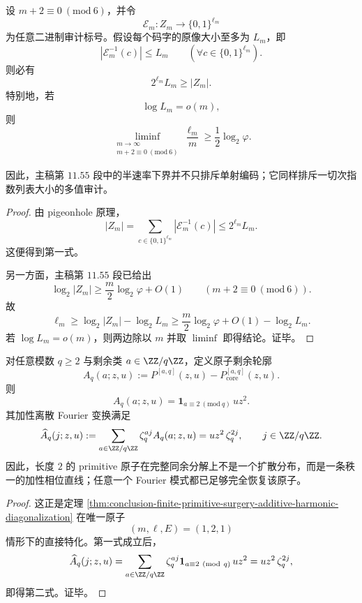 \begin{theorem}[六倍窗零块的次指数列表审计不可能性]\label{thm:conclusion-sixfold-zero-block-subexponential-list-impossibility}
设 \(m+2\equiv 0\ (\mathrm{mod}\ 6)\)，并令
\[
\mathcal E_m: Z_m\to\{0,1\}^{\ell_m}
\]
为任意二进制审计标号。假设每个码字的原像大小至多为 \(L_m\)，即
\[
|\mathcal E_m^{-1}(c)|\le L_m
\qquad
(\forall c\in\{0,1\}^{\ell_m}).
\]
则必有
\[
2^{\ell_m}L_m\ge |Z_m|.
\]
特别地，若
\[
\log L_m=o(m),
\]
则
\[
\liminf_{\substack{m\to\infty\\ m+2\equiv0\ (\mathrm{mod}\ 6)}}\frac{\ell_m}{m}
\ge \frac12\log_2\varphi.
\]

因此，主稿第 \(11.55\) 段中的半速率下界并不只排斥单射编码；它同样排斥一切次指数列表大小的多值审计。
\end{theorem}
\begin{proof}
由 pigeonhole 原理，
\[
|Z_m|
=
\sum_{c\in\{0,1\}^{\ell_m}} |\mathcal E_m^{-1}(c)|
\le 2^{\ell_m}L_m.
\]
这便得到第一式。

另一方面，主稿第 \(11.55\) 段已给出
\[
\log_2|Z_m|\ge \frac{m}{2}\log_2\varphi+O(1)
\qquad
(m+2\equiv0\ (\mathrm{mod}\ 6)).
\]
故
\[
\ell_m
\ge
\log_2|Z_m|-\log_2L_m
\ge
\frac{m}{2}\log_2\varphi+O(1)-\log_2L_m.
\]
若 \(\log L_m=o(m)\)，则两边除以 \(m\) 并取 \(\liminf\) 即得结论。证毕。
\end{proof}

\begin{theorem}\label{thm:conclusion-primitive-length-two-additive-fourier-rank-one}
对任意模数 \(q\ge2\) 与剩余类 \(a\in\ZZ/q\ZZ\)，定义原子剩余轮廓
\[
A_q(a;z,u):=P^{[a,q]}(z,u)-P_{\mathrm{core}}^{[a,q]}(z,u).
\]
则
\[
A_q(a;z,u)=\mathbf 1_{a\equiv 2\ (\mathrm{mod}\ q)}\,u z^2.
\]
其加性离散 Fourier 变换满足
\[
\widehat A_q(j;z,u)
:=
\sum_{a\in\ZZ/q\ZZ}\zeta_q^{aj}A_q(a;z,u)
=
u z^2\,\zeta_q^{2j},
\qquad
j\in\ZZ/q\ZZ.
\]
因此，长度 \(2\) 的 primitive 原子在完整同余分解上不是一个扩散分布，而是一条秩一的加性相位直线；任意一个 Fourier 模式都已足够完全恢复该原子。
\end{theorem}
\begin{proof}
这正是定理 \ref{thm:conclusion-finite-primitive-surgery-additive-harmonic-diagonalization} 在唯一原子
\[
(m,\ell,E)=(1,2,1)
\]
情形下的直接特化。第一式成立后，
\[
\widehat A_q(j;z,u)
=
\sum_{a\in\ZZ/q\ZZ}\zeta_q^{aj}\mathbf 1_{a\equiv 2\ (\mathrm{mod}\ q)}\,u z^2
=
u z^2\,\zeta_q^{2j},
\]
即得第二式。证毕。
\end{proof}

